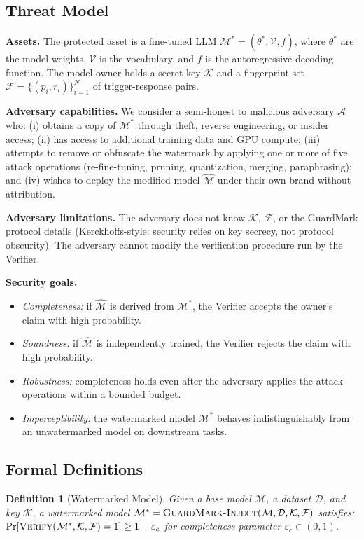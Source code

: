 \documentclass[journal,compsoc]{IEEEtran}
\newtheorem{definition}{Definition}
\newcommand{\M}{\mathcal{M}}
\newcommand{\K}{\mathcal{K}}
\newcommand{\F}{\mathcal{F}}
\begin{document}
\subsection{Threat Model}

\textbf{Assets.} The protected asset is a fine-tuned LLM
$\M^* = (\theta^*, \mathcal{V}, f)$, where $\theta^*$ are the model weights,
$\mathcal{V}$ is the vocabulary, and $f$ is the autoregressive decoding
function. The model owner holds a secret key $\K$ and a fingerprint set
$\F = \{(p_i, r_i)\}_{i=1}^{N}$ of trigger-response pairs.

\textbf{Adversary capabilities.} We consider a semi-honest to malicious
adversary $\mathcal{A}$ who: (i) obtains a copy of $\M^*$ through theft,
reverse engineering, or insider access; (ii) has access to additional training
data and GPU compute; (iii) attempts to remove or obfuscate the watermark by
applying one or more of five attack operations (re-fine-tuning, pruning,
quantization, merging, paraphrasing); and (iv) wishes to deploy the modified
model $\hat{\M}$ under their own brand without attribution.

\textbf{Adversary limitations.} The adversary does not know $\K$, $\F$, or the
GuardMark protocol details (Kerckhoffs-style: security relies on key secrecy,
not protocol obscurity). The adversary cannot modify the verification procedure
run by the Verifier.

\textbf{Security goals.}
\begin{itemize}
  \item \textit{Completeness:} if $\hat{\M}$ is derived from $\M^*$, the
    Verifier accepts the owner's claim with high probability.
  \item \textit{Soundness:} if $\hat{\M}$ is independently trained, the
    Verifier rejects the claim with high probability.
  \item \textit{Robustness:} completeness holds even after the adversary applies
    the attack operations within a bounded budget.
  \item \textit{Imperceptibility:} the watermarked model $\M^*$ behaves
    indistinguishably from an unwatermarked model on downstream tasks.
\end{itemize}

\subsection{Formal Definitions}

\begin{definition}[Watermarked Model]
Given a base model $\M$, a dataset $\mathcal{D}$, and key $\K$, a watermarked
model $\M^* = \textsc{GuardMark-Inject}(\M, \mathcal{D}, \K, \F)$ satisfies:
$\Pr[\textsc{Verify}(\M^*, \K, \F) = 1] \geq 1 - \varepsilon_c$ for
completeness parameter $\varepsilon_c \in (0,1)$.
\end{definition}
\end{document}
